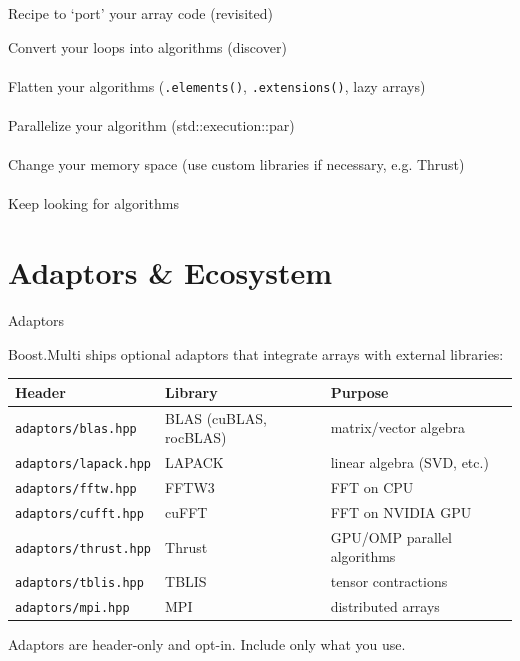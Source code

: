 \documentclass[t,aspectratio=169,handout]{beamer}
\begin{document}
\begin{frame}{Recipe to `port' your array code (revisited)}
\begin{center}
  Convert your loops into algorithms (discover)\\
        \\
      Flatten your algorithms (\lstinline|.elements()|, \lstinline|.extensions()|, lazy arrays)\\
        \\
      Parallelize your algorithm (std::execution::par)\\
          \\
      Change your memory space (use custom libraries if necessary, e.g. Thrust)\\
          \\
      Keep looking for algorithms
  \end{center}
\end{frame}

\section{Adaptors \& Ecosystem}

\begin{frame}[label=adaptors1]{Adaptors}

Boost.Multi ships optional adaptors that integrate arrays with external libraries:

\begin{table}
\small
\begin{tabular}{lll}
\textbf{Header} & \textbf{Library} & \textbf{Purpose} \\
\hline
\lstinline|adaptors/blas.hpp|    & BLAS (cuBLAS, rocBLAS) & matrix/vector algebra \\
\lstinline|adaptors/lapack.hpp|  & LAPACK               & linear algebra (SVD, etc.) \\
\lstinline|adaptors/fftw.hpp|    & FFTW3                & FFT on CPU \\
\lstinline|adaptors/cufft.hpp|   & cuFFT                & FFT on NVIDIA GPU \\
\lstinline|adaptors/thrust.hpp|  & Thrust               & GPU/OMP parallel algorithms \\
\lstinline|adaptors/tblis.hpp|   & TBLIS                & tensor contractions \\
\lstinline|adaptors/mpi.hpp|     & MPI                  & distributed arrays \\
\end{tabular}
\end{table}

\begin{block}{}
  Adaptors are header-only and opt-in. Include only what you use.
\end{block}

\end{frame}
\end{document}
